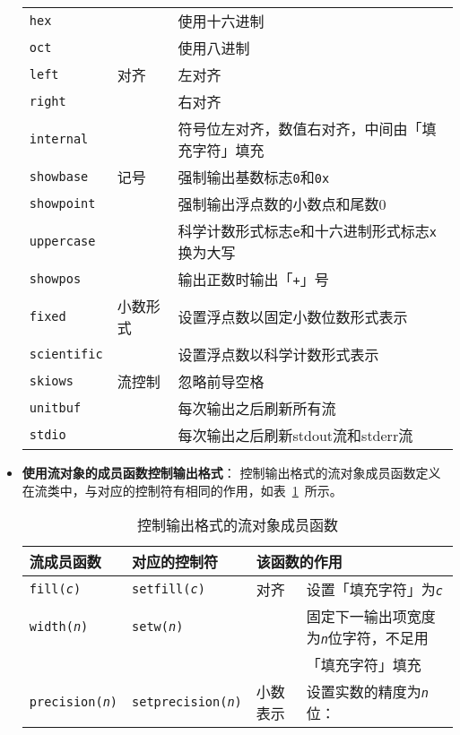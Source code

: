 \documentclass[10pt, a4paper, oneside, fontset=none]{ctexart}
\theoremstyle{plain}
\theoremstyle{definition}
\begin{document}
\begin{itemize}
\begin{table}[ht!]
\begin{tabular}{lll}
			\texttt{hex} & ~ & 使用十六进制 \\
			\texttt{oct} & ~ & 使用八进制 \\
			\texttt{left} & 对齐 & 左对齐 \\
			\texttt{right} & ~ & 右对齐 \\
			\texttt{internal} & ~ & 符号位左对齐，数值右对齐，中间由「填充字符」填充 \\
			\texttt{showbase} & 记号 & 强制输出基数标志\texttt{0}和\texttt{0x} \\
			\texttt{showpoint} & ~ & 强制输出浮点数的小数点和尾数0 \\
			\texttt{uppercase} & ~ & 科学计数形式标志\texttt{e}和十六进制形式标志\texttt{x}换为大写 \\
			\texttt{showpos} & ~ & 输出正数时输出「\texttt{+}」号 \\
			\texttt{fixed} & 小数形式 & 设置浮点数以固定小数位数形式表示 \\
			\texttt{scientific} & ~ & 设置浮点数以科学计数形式表示 \\
			\texttt{skiows} & 流控制 & 忽略前导空格 \\
			\texttt{unitbuf} & ~ & 每次输出之后刷新所有流 \\
			\texttt{stdio} & ~ & 每次输出之后刷新stdout流和stderr流 \\
			\bottomrule
		\end{tabular}
	\end{table}
	\item \textbf{使用流对象的成员函数控制输出格式}：
	控制输出格式的流对象成员函数定义在流类中，与对应的控制符有相同的作用，如表~\ref{Tab: 控制输出格式的流对象成员函数}~所示。
	\begin{table}[ht!]
		\caption{控制输出格式的流对象成员函数}\label{Tab: 控制输出格式的流对象成员函数}
		\centering
		\begin{tabular}{llll}
			\toprule
			\textbf{流成员函数} & \textbf{对应的控制符} & \multicolumn{2}{l}{\textbf{该函数的作用}}\\
			\midrule
			\texttt{fill(\textit{c})} & \texttt{setfill(\textit{c})} & 对齐 & 设置「填充字符」为\texttt{\textit{c}} \\
			\texttt{width(\textit{n})} & \texttt{setw(\textit{n})} & ~ & 固定下一输出项宽度为\texttt{\textit{n}}位字符，不足用 \\
			~ & ~ & ~ & \quad「填充字符」填充 \\
			\texttt{precision(\textit{n})} & \texttt{setprecision(\textit{n})} & 小数表示 & 设置实数的精度为\texttt{\textit{n}}位：\\

\end{tabular}
\end{table}
\end{itemize}
\end{document}
